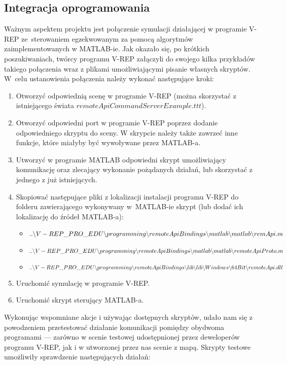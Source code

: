\documentclass[11pt, a4paper, twoside]{article}
\begin{document}
	\subsection{Integracja oprogramowania}
	\label{subsec:integracja}
	Ważnym aspektem projektu jest połączenie symulacji działającej w programie V-REP ze~sterowaniem egzekwowanym za pomocą algorytmów zaimplementowanych w MATLAB-ie. Jak okazało się, po krótkich poszukiwaniach, twórcy programu V-REP załączyli do swojego kilka przykładów takiego połączenia wraz z plikami umożliwiającymi pisanie własnych skryptów. W~celu ustanowienia połączenia należy wykonać następujące kroki:
	\begin{enumerate}[1)]
		\item Otworzyć odpowiednią scenę w programie V-REP (można skorzystać z istniejącego świata $remoteApiCommandServerExample.ttt$).
		\item Otworzyć odpowiedni port w programie V-REP poprzez dodanie odpowiedniego skryptu do sceny. W skrypcie należy także zawrzeć inne funkcje, które miałyby być wywoływane przez MATLAB-a.
		\item Utworzyć w programie MATLAB odpowiedni skrypt umożliwiający komunikację oraz zlecający wykonanie pożądanych działań, lub skorzystać z jednego z już istniejących.
		\item Skopiować następujące pliki z lokalizacji instalacji programu V-REP do folderu zawierającego wykonywany w~MATLAB-ie skrypt (lub dodać ich lokalizację do źródeł MATLAB-a):
		\begin{itemize}
			\item $..\backslash V-REP\_PRO\_EDU\backslash programming\backslash remoteApiBindings\backslash \\matlab\backslash matlab\backslash remApi.m$
			\item $..\backslash V-REP\_PRO\_EDU\backslash programming\backslash remoteApiBindings\backslash \\matlab\backslash matlab\backslash remoteApiProto.m$
			\item $..\backslash V-REP\_PRO\_EDU\backslash programming\backslash remoteApiBindings\backslash \\lib\backslash lib\backslash Windows\backslash 64Bit\backslash remoteApi.dll$
		\end{itemize}
		\item Uruchomić symulację w programie V-REP.
		\item Uruchomić skrypt sterujący MATLAB-a.
	\end{enumerate}
	Wykonując wspomniane akcje i używając dostępnych skryptów, udało nam się z powodzeniem przetestować działanie komunikacji pomiędzy obydwoma programami --- zarówno w scenie testowej udostępnionej przez deweloperów programu V-REP, jak i w utworzonej przez nas scenie z mapą. Skrypty testowe umożliwiły sprawdzenie następujących działań:
\end{document}
